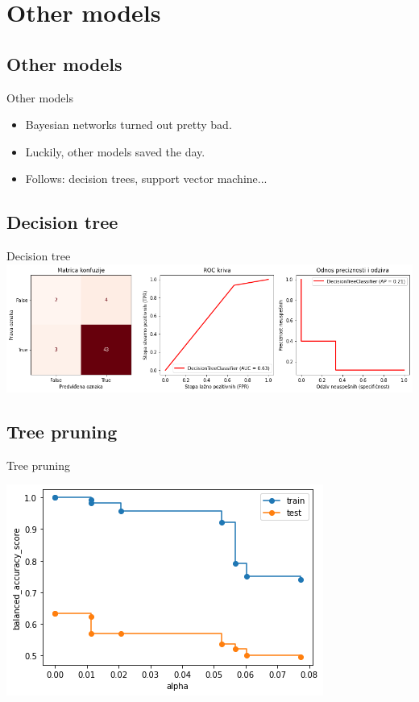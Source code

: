 \documentclass[hyperref={bookmarks=false}]{beamer}
\begin{document}
\section{Other models}
\subsection{Other models}
\begin{frame}{Other models}
\begin{itemize}
    \item Bayesian networks turned out pretty bad.
    \item Luckily, other models saved the day.
    \item Follows: decision trees, support vector machine...
\end{itemize}
\end{frame}

\subsection{Decision tree}
\begin{frame}{Decision tree}
\includegraphics[width=\textwidth]{tree.png}
\end{frame}

\subsection{Tree pruning}
\begin{frame}{Tree pruning}
\begin{center}
    \includegraphics[width=.75\textwidth]{pruning.png}
\end{center}
\end{frame}
\end{document}
